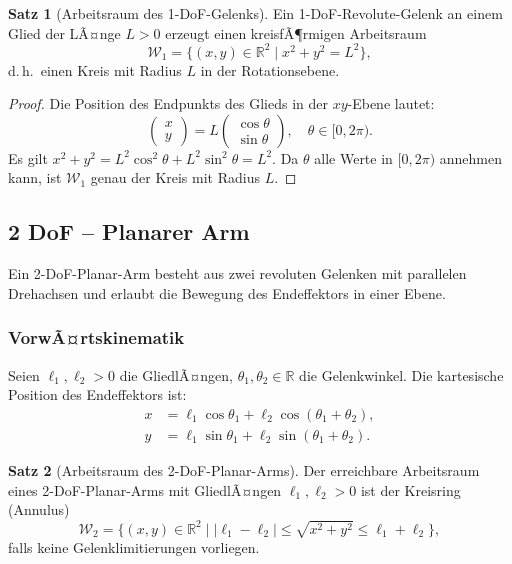 ﻿\documentclass[a4paper,12pt]{article}
\theoremstyle{definition}
\newtheorem{satz}{Satz}
\begin{document}
\begin{satz}[Arbeitsraum des 1-DoF-Gelenks]
	Ein 1-DoF-Revolute-Gelenk an einem Glied der LÃ¤nge $L > 0$ erzeugt einen kreisfÃ¶rmigen Arbeitsraum
	\[
		\mathcal{W}_1 = \{(x, y) \in \mathbb{R}^2 \mid x^2 + y^2 = L^2\},
	\]
	d.\,h.\ einen Kreis mit Radius $L$ in der Rotationsebene.
\end{satz}

\begin{proof}
	Die Position des Endpunkts des Glieds in der $xy$-Ebene lautet:
	\[
		\begin{pmatrix} x \\ y \end{pmatrix} = L \begin{pmatrix} \cos\theta \\ \sin\theta \end{pmatrix}, \quad \theta \in [0, 2\pi).
	\]
	Es gilt $x^2 + y^2 = L^2 \cos^2\theta + L^2 \sin^2\theta = L^2$. Da $\theta$ alle Werte in $[0,2\pi)$ annehmen kann, ist $\mathcal{W}_1$ genau der Kreis mit Radius $L$. \qedhere
\end{proof}

\subsection{2 DoF -- Planarer Arm}

Ein 2-DoF-Planar-Arm besteht aus zwei revoluten Gelenken mit parallelen Drehachsen und erlaubt die Bewegung des Endeffektors in einer Ebene.

\subsubsection{VorwÃ¤rtskinematik}

Seien $\ell_1, \ell_2 > 0$ die GliedlÃ¤ngen, $\theta_1, \theta_2 \in \mathbb{R}$ die Gelenkwinkel. Die kartesische Position des Endeffektors ist:
\begin{align}
	x &= \ell_1 \cos\theta_1 + \ell_2 \cos(\theta_1 + \theta_2), \label{eq:fk2x} \\
	y &= \ell_1 \sin\theta_1 + \ell_2 \sin(\theta_1 + \theta_2). \label{eq:fk2y}
\end{align}

\begin{satz}[Arbeitsraum des 2-DoF-Planar-Arms]
\label{satz:ws2}
	Der erreichbare Arbeitsraum eines 2-DoF-Planar-Arms mit GliedlÃ¤ngen $\ell_1, \ell_2 > 0$ ist der Kreisring (Annulus)
	\[
		\mathcal{W}_2 = \{(x,y) \in \mathbb{R}^2 \mid |\ell_1 - \ell_2| \leq \sqrt{x^2+y^2} \leq \ell_1 + \ell_2\},
	\]
	falls keine Gelenklimitierungen vorliegen.
\end{satz}
\end{document}
